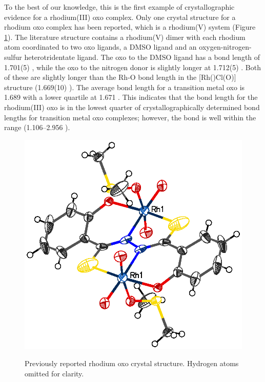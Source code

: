 To the best of our knowledge, this is the first example of crystallographic evidence for a rhodium(III) oxo complex.  Only one crystal structure for a rhodium oxo complex has been reported, which is a rhodium(V) system \ce{[(RhO2)2(C6H4(O)-C(=S)-N=N-C(=S)(O)C6H4)(DMSO)2]} (Figure \ref{Kaczul}).\cite{Gangopadhyay2010}  The literature structure contains a rhodium(V) dimer with each rhodium atom coordinated to two oxo ligands, a DMSO ligand and an oxygen-nitrogen-sulfur heterotridentate ligand.  The oxo \trans{} to the DMSO ligand has a bond length of 1.701(5) \A, while the oxo \trans{} to the nitrogen donor is slightly longer at 1.712(5) \A.  Both of these are slightly longer than the Rh-O bond length in the [Rh(\tBuxantphos)Cl(O)] structure (1.669(10) \A).  The average bond length for a transition metal oxo is 1.689 \A{} with a lower quartile at 1.671 \A.\cite{Allen2002}  This indicates that the bond length for the rhodium(III) oxo is in the lowest quarter of crystallographically determined bond lengths for transition metal oxo complexes; however, the bond is well within the range (1.106--2.956 \A).  

\begin{figure}[htb]
\begin{center}
\includegraphics[scale=0.8]{../Othercrystals/KACZUL2.eps}
\caption[Previously reported rhodium oxo crystal structure]{Previously reported rhodium oxo crystal structure.\cite{Gangopadhyay2010} Hydrogen atoms omitted for clarity.}
\vspace{0.2cm}
\label{Kaczul}
\end{center}
\end{figure}
\vspace{0.2cm}

